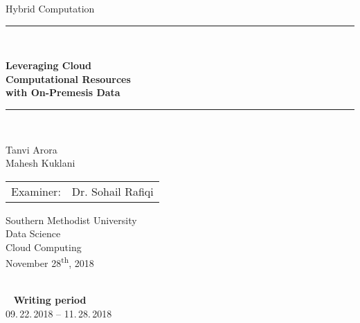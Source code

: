     
\begin{titlepage}
\begin{center}

\newcommand{\HorizontalLine}{\rule{\linewidth}{0.3mm}}

{\Large Hybrid Computation}\\[1.3cm]

  

\HorizontalLine \\[0.4cm]
\begin{spacing}{3}
    {\huge \bfseries Leveraging Cloud } \\
    {\huge \bfseries Computational Resources} \\
    {\huge \bfseries with On-Premesis Data
    }\\
\end{spacing}
\HorizontalLine \\[1.5cm]

\begin{spacing}{3}
    {\Huge Tanvi Arora} \\
    {\Huge Mahesh Kuklani} \\[1.5cm]
\end{spacing}

\begin{tabular}[hc]{>{\huge}l >{\huge}l}
Examiner: & Dr. Sohail Rafiqi \\[0.3cm]
\end{tabular}
\vfill  %

\Large {
    Southern Methodist University\\
    Data Science\\
    Cloud Computing\\[0.5cm]
    November 28\textsuperscript{th}, 2018\\
}
\end{center}
\end{titlepage}

\ \vfill \ \\  %
\
\textbf{Writing period}            \smallskip{} \\
09.\,22.\,2018 -- 11.\,28.\,2018   \bigskip{} \\
\